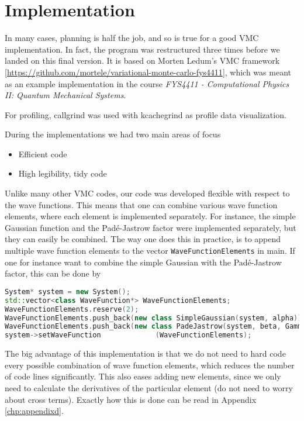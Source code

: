 \chapter{Implementation} \label{sec:implementation}
In many cases, planning is half the job, and so is true for a good VMC implementation. In fact, the program was restructured three times before we landed on this final version. It is based on Morten Ledum's VMC framework [\url{https://github.com/mortele/variational-monte-carlo-fys4411}], which was meant as an example implementation in the course \textit{FYS4411 - Computational Physics II: Quantum Mechanical Systems}.

For profiling, callgrind was used with kcachegrind as profile data visualization. 

During the implementations we had two main areas of focus
\begin{itemize}
	\item Efficient code
	\item High legibility, tidy code
\end{itemize}

Unlike many other VMC codes, our code was developed flexible with respect to the wave functions. This means that one can combine various wave function elements, where each element is implemented separately. For instance, the simple Gaussian function and the Padé-Jastrow factor were implemented separately, but they can easily be combined. The way one does this in practice, is to append multiple wave function elements to the vector \texttt{WaveFunctionElements} in main. If one for instance want to combine the simple Gaussian with the Padé-Jastrow factor, this can be done by

\lstset{basicstyle=\scriptsize}
\begin{lstlisting}[language=c++]
System* system = new System();
std::vector<class WaveFunction*> WaveFunctionElements;
WaveFunctionElements.reserve(2);
WaveFunctionElements.push_back(new class SimpleGaussian(system, alpha));
WaveFunctionElements.push_back(new class PadeJastrow(system, beta, Gamma));
system->setWaveFunction             (WaveFunctionElements);
\end{lstlisting}

The big advantage of this implementation is that we do not need to hard code every possible combination of wave function elements, which reduces the number of code lines significantly. This also eases adding new elements, since we only need to calculate the derivatives of the particular element (do not need to worry about cross terms). Exactly how this is done can be read in Appendix \ref{chp:appendixd}. 

